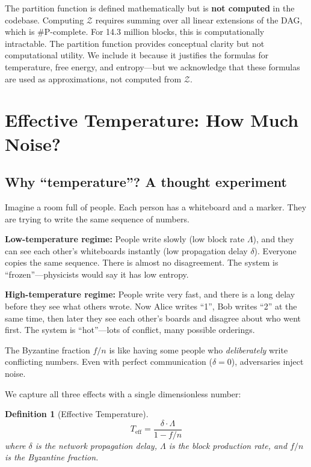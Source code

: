 \documentclass[11pt,a4paper]{article}
\newtheorem{definition}[theorem]{Definition}
\begin{document}
\begin{honesty}
The partition function is defined mathematically but is \textbf{not computed} in the codebase. Computing $\mathcal{Z}$ requires summing over all linear extensions of the DAG, which is \#P-complete. For 14.3 million blocks, this is computationally intractable. The partition function provides conceptual clarity but not computational utility. We include it because it justifies the formulas for temperature, free energy, and entropy---but we acknowledge that these formulas are used as approximations, not computed from $\mathcal{Z}$.
\end{honesty}

\section{Effective Temperature: How Much Noise?}

\subsection{Why ``temperature''? A thought experiment}

Imagine a room full of people. Each person has a whiteboard and a marker. They are trying to write the same sequence of numbers.

\textbf{Low-temperature regime:} People write slowly (low block rate $\Lambda$), and they can see each other's whiteboards instantly (low propagation delay $\delta$). Everyone copies the same sequence. There is almost no disagreement. The system is ``frozen''---physicists would say it has low entropy.

\textbf{High-temperature regime:} People write very fast, and there is a long delay before they see what others wrote. Now Alice writes ``1'', Bob writes ``2'' at the same time, then later they see each other's boards and disagree about who went first. The system is ``hot''---lots of conflict, many possible orderings.

The Byzantine fraction $f/n$ is like having some people who \emph{deliberately} write conflicting numbers. Even with perfect communication ($\delta = 0$), adversaries inject noise.

We capture all three effects with a single dimensionless number:

\begin{definition}[Effective Temperature]
\begin{equation}
\boxed{T_{\text{eff}} = \frac{\delta \cdot \Lambda}{1 - f/n}}
\end{equation}
where $\delta$ is the network propagation delay, $\Lambda$ is the block production rate, and $f/n$ is the Byzantine fraction.
\end{definition}
\end{document}
